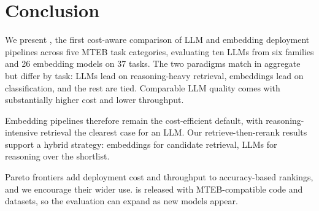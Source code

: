 \section{Conclusion}
\label{sec:conclusion}

We present \mteblm{}, the first cost-aware comparison of LLM and embedding deployment pipelines across five MTEB task categories, evaluating ten LLMs from six families and 26 embedding models on 37 tasks.
The two paradigms match in aggregate but differ by task: LLMs lead on reasoning-heavy retrieval, embeddings lead on classification, and the rest are tied. Comparable LLM quality comes with substantially higher cost and lower throughput.

Embedding pipelines therefore remain the cost-efficient default, with reasoning-intensive retrieval the clearest case for an LLM.
Our retrieve-then-rerank results support a hybrid strategy: embeddings for candidate retrieval, LLMs for reasoning over the shortlist.

Pareto frontiers add deployment cost and throughput to accuracy-based rankings, and we encourage their wider use.
\mteblm{} is released with MTEB-compatible code and datasets, so the evaluation can expand as new models appear.
